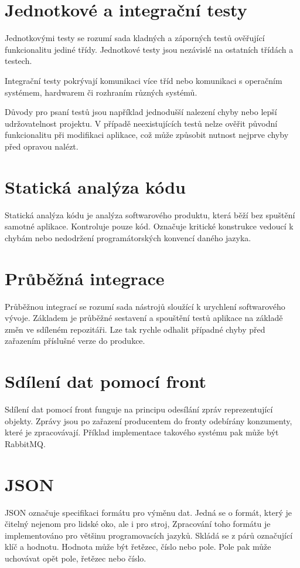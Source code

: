 \documentclass[thesis=B,czech]{FITthesis}[2012/06/26]
\begin{document}
\section{Jednotkové a integrační testy}
Jednotkovými testy se rozumí sada kladných a záporných testů ověřující funkcionalitu jediné třídy. Jednotkové testy
jsou nezávislé na ostatních třídách a testech. \cite{testing} 
\par
Integrační testy pokrývají komunikaci více tříd nebo komunikaci s operačním systémem, hardwarem či rozhraním různých systémů. \cite{testing}
\par
Důvody pro psaní testů jsou například jednodušší nalezení chyby nebo lepší udržovatelnost projektu. V případě neexistujících testů nelze ověřit původní
funkcionalitu při modifikaci aplikace, což může způsobit nutnost nejprve chyby před opravou nalézt.\cite{testing}

\section{Statická analýza kódu}
Statická analýza kódu je analýza softwarového produktu, která běží bez spuštění samotné aplikace. Kontroluje 
pouze kód. Označuje kritické konstrukce vedoucí k chybám nebo nedodržení programátorských konvencí daného
jazyka.
\section{Průběžná integrace}
Průběžnou integrací se rozumí sada nástrojů sloužící k urychlení softwarového vývoje. Základem je průběžné sestavení
a spouštění testů aplikace na základě změn ve sdíleném repozitáři. Lze tak rychle odhalit případné chyby před zařazením 
příslušné verze do produkce.\cite{CI}

\section{Sdílení dat pomocí front}
Sdílení dat pomocí front funguje na principu odesílání zpráv reprezentující objekty. Zprávy jsou po zařazení producentem do fronty odebírány
konzumenty, které je zpracovávají.
Příklad implementace takového systému pak může být RabbitMQ. \cite{rabbitMQ}

\section{JSON}
JSON označuje specifikaci formátu pro výměnu dat\cite{JSON}. Jedná se o formát, který je čitelný nejenom pro lidské oko, ale i pro stroj\cite{JSON},
Zpracování toho formátu je implementováno pro většinu programovacích jazyků\cite{JSON-impl}. Skládá se z párů označující
klíč a hodnotu. Hodnota může být řetězec, číslo nebo pole. Pole pak může uchovávat opět pole, řetězec nebo číslo. \cite{JSON}
\end{document}
